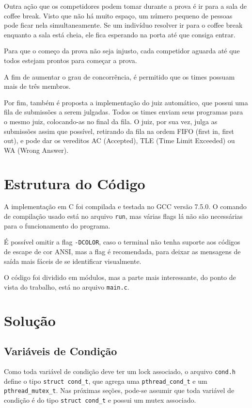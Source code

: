 \documentclass[11pt]{article}
\newcommand{\code}{\lstinline[mathescape=true]}
\begin{document}
Outra ação que os competidores podem tomar durante a prova é ir para a sala de coffee break. Visto
que não há muito espaço, um número pequeno de pessoas pode ficar nela simultaneamente. Se um
indivíduo resolver ir para o coffee break enquanto a sala está cheia, ele fica esperando na porta até
que consiga entrar.

Para que o começo da prova não seja injusto, cada competidor aguarda até que todos estejam prontos
para começar a prova.

A fim de aumentar o grau de concorrência, é permitido que os times possuam mais de três membros.

Por fim, também é proposta a implementação do juiz automático, que possui uma fila de submissões a
serem julgadas. Todos os times enviam seus programas para o mesmo juiz, colocando-as no final da
fila. O juiz, por sua vez, julga as submissões assim que possível, retirando da fila na ordem FIFO
(first in, first out), e pode dar os vereditos AC (Accepted), TLE (Time Limit Exceeded) ou WA (Wrong
Answer).

\section{Estrutura do Código}
A implementação em C foi compilada e testada no GCC versão 7.5.0. O comando de compilação usado está no
arquivo \code{run}, mas várias flags lá não são necessárias para o funcionamento do programa.

É possível omitir a flag \code{-DCOLOR}, caso o terminal não tenha suporte aos códigos de escape de
cor ANSI\cite{ansi_color}, mas a flag é recomendada, para deixar as mensagens de saída mais fáceis de
se identificar visualmente.

O código foi dividido em módulos, mas a parte mais interessante, do ponto de vista do trabalho, está
no arquivo \code{main.c}.

\section{Solução}

\subsection{Variáveis de Condição}
Como toda variável de condição deve ter um lock associado, o arquivo \code{cond.h} define o tipo
\code{struct cond_t}, que agrega uma \code{pthread_cond_t} e um \code{pthread_mutex_t}. Nas próximas
seções, pode-se assumir que toda variável de condição é do tipo \code{struct cond_t} e possui um
mutex associado.
\end{document}
